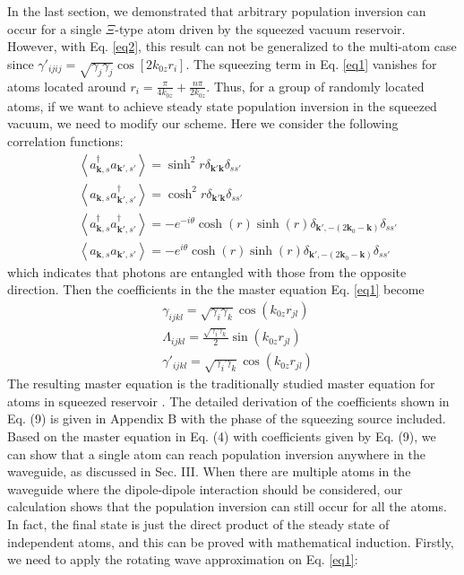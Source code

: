 \documentclass[aps,showpacs,twocolumn,twoside,groupedaddress]{revtex4}
\let\vec\bm
\begin{document}
In the last section, we demonstrated that arbitrary population inversion can occur for a single $\Xi$-type atom driven by the squeezed vacuum reservoir. However, with Eq.  \eqref{eq2}, this result can not be generalized to the multi-atom case since $\gamma'_{ijij}=\sqrt{\gamma_{j}\gamma_{j}}\cos[2k_{0z}r_{i}]$. The squeezing term in Eq. \eqref{eq1} vanishes for atoms located around $r_i=\frac{\pi}{4k_{0z}}+\frac{n\pi}{2k_{0z}}$. Thus, for a group of randomly located atoms, if we want to achieve steady state population inversion in the squeezed vacuum, we need to modify our scheme. Here we consider the following correlation functions:
\begin{equation}
\label{eq0b}
\begin{split}
& \left\langle a_{\vec{k},s}^{\dagger}a_{\vec{k}',s'}\right\rangle =\sinh^{2}r\delta_{\vec{k}'\vec{k}}\delta_{ss'} \\
& \left\langle a_{\vec{k},s}a_{\vec{k}',s'}^{\dagger}\right\rangle =\cosh^{2}r\delta_{\vec{k}'\vec{k}}\delta_{ss'}\\
& \left\langle a_{\vec{k},s}^{\dagger}a_{\vec{k}',s'}^{\dagger}\right\rangle =-e^{-i\theta}\cosh(r)\sinh(r)\delta_{\vec{k}',-(2\vec{k}_{0}-\vec{k})}\delta_{ss'}\\
&\left\langle a_{\vec{k},s}a_{\vec{k}',s'}\right\rangle =-e^{i\theta}\cosh(r)\sinh(r)\delta_{\vec{k}',-(2\vec{k}_{0}-\vec{k})}\delta_{ss'}
\end{split}
\end{equation}
which indicates that photons are entangled with those from the opposite direction. Then the coefficients in the the master equation Eq.  \eqref{eq1} become
\begin{equation}
\label{eq2b}
\begin{split}
& \gamma_{ijkl}=\sqrt{\gamma_{i}\gamma_{k}}\cos(k_{0z}r_{jl}) \\
& \Lambda_{ijkl}=\frac{\sqrt{\gamma_{i}\gamma_{k}}}{2}\sin(k_{0z}r_{jl})\\
& \gamma'_{ijkl}=\sqrt{\gamma_{i}\gamma_{k}}\cos(k_{0z}r_{jl})
\end{split}
\end{equation}
The resulting master equation is the traditionally studied master equation for atoms in squeezed reservoir  \cite{tanas2004stationary}. The detailed derivation of the coefficients shown in Eq. (9) is given in Appendix B with the phase of the squeezing source included. Based on the master equation in Eq. (4) with coefficients given by Eq. (9), we can show that a single atom can reach population inversion anywhere in the waveguide, as discussed in Sec. III. When there are multiple atoms in the waveguide where the dipole-dipole interaction should be considered, our calculation shows that the population inversion can still occur for all the atoms. In fact, the final state is just the direct product of the steady state of independent atoms, and this can be proved with mathematical induction. Firstly, we need to apply the rotating wave approximation on Eq. \eqref{eq1}: 
\end{document}
